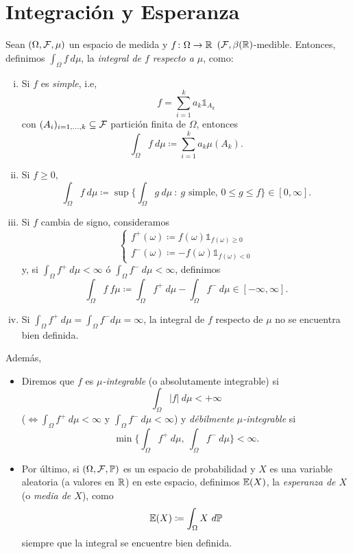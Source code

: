 
\section{Integración y Esperanza}

Sean $(\Omega, \mathcal{F}, \mu)$ un espacio de medida y $f \colon \Omega \to \mathbb{R}$ $(\mathcal{F}, \beta(\mathbb{R})$-medible. Entonces, definimos $\int_{\Omega} f \ d\mu$, la \textit{integral de $f$ respecto a $\mu$}, como:

\begin{enumerate}[i)]
	\item Si $f$ es \textit{simple}, i.e,
	\[ f = \sum_{i=1}^{k} a_{k} \mathds{1}_{A_{k}} \]
	con $(A_{i})_{i = 1,\dots,k} \subseteq \mathcal{F}$ partición finita de $\Omega$, entonces
	\[ \int_{\Omega} f \ d\mu \coloneq \sum_{i=1}^{k} a_{k} \mu(A_{k}). \]

	\item Si $f \geq 0$,
	\[ \int_{\Omega} f \ d\mu \coloneq \sup \Big\{ \int_{\Omega} g \ d\mu \ : \ g \text{ simple, } 0 \leq g \leq f \Big\} \in [0,\infty]. \]

	\item Si $f$ cambia de signo, consideramos
	\[ \begin{cases}
		f^{+}(\omega) \coloneq f(\omega) \mathds{1}_{f(\omega) \geq 0} \\
		f^{-}(\omega) \coloneq -f(\omega) \mathds{1}_{f(\omega) < 0}
	\end{cases} \]
	y, si $\int_{\Omega} f^{+} \ d\mu < \infty$ ó $\int_{\Omega} f^{-} \ d\mu < \infty$, definimos
	\[ \int_{\Omega} f \ f\mu \coloneq \int_{\Omega} f^{+} \ d\mu - \int_{\Omega} f^{-} \ d\mu \in [-\infty,\infty]. \]

	\item Si $\int_{\Omega} f^{+} \ d\mu = \int_{\Omega} f^{-} d\mu = \infty$, la integral de $f$ respecto de $\mu$ no se encuentra bien definida.
\end{enumerate}

\noindent Además,

\begin{itemize}
	\item Diremos que $f$ es \textit{$\mu$-integrable} (o absolutamente integrable) si
	\[ \int_{\Omega} |f| \ d\mu < +\infty \]
	($\iff \int_{\Omega} f^{+} \ d\mu < \infty$ y $\int_{\Omega} f^{-} \ d\mu < \infty$) y \textit{débilmente $\mu$-integrable} si
	\[ \min \Big\{ \int_{\Omega} f^{+} \ d\mu, \ \int_{\Omega} f^{-} \ d\mu \Big\} < \infty. \]

	\item Por último, si $(\Omega, \mathcal{F}, \mathbb{P})$ es un espacio de probabilidad y $X$ es una variable aleatoria (a valores en $\mathbb{R}$) en este espacio, definimos $\mathbb{E}(X)$, la \textit{esperanza de $X$} (o \textit{media de $X$}), como
	\[ \mbb{E}(X) \coloneq \int_{\Omega} X \ d\mbb{P} \]
	siempre que la integral se encuentre bien definida.
\end{itemize}


